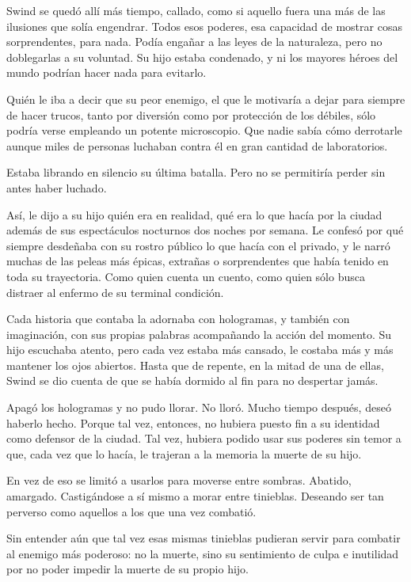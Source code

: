 Swind se quedó allí más tiempo, callado, como si aquello fuera una más de las ilusiones que solía engendrar. Todos esos poderes, esa capacidad de mostrar cosas sorprendentes, para nada. Podía engañar a las leyes de la naturaleza, pero no doblegarlas a su voluntad. Su hijo estaba condenado, y ni los mayores héroes del mundo podrían hacer nada para evitarlo.

Quién le iba a decir que su peor enemigo, el que le motivaría a dejar para siempre de hacer trucos, tanto por diversión como por protección de los débiles, sólo podría verse empleando un potente microscopio. Que nadie sabía cómo derrotarle aunque miles de personas luchaban contra él en gran cantidad de laboratorios.

Estaba librando en silencio su última batalla. Pero no se permitiría perder sin antes haber luchado.

Así, le dijo a su hijo quién era en realidad, qué era lo que hacía por la ciudad además de sus espectáculos nocturnos dos noches por semana. Le confesó por qué siempre desdeñaba con su rostro público lo que hacía con el privado, y le narró muchas de las peleas más épicas, extrañas o sorprendentes que había tenido en toda su trayectoria. Como quien cuenta un cuento, como quien sólo busca distraer al enfermo de su terminal condición.

Cada historia que contaba la adornaba con hologramas, y también con imaginación, con sus propias palabras acompañando la acción del momento. Su hijo escuchaba atento, pero cada vez estaba más cansado, le costaba más y más mantener los ojos abiertos. Hasta que de repente, en la mitad de una de ellas, Swind se dio cuenta de que se había dormido al fin para no despertar jamás.

Apagó los hologramas y no pudo llorar. No lloró. Mucho tiempo después, deseó haberlo hecho. Porque tal vez, entonces, no hubiera puesto fin a su identidad como defensor de la ciudad. Tal vez, hubiera podido usar sus poderes sin temor a que, cada vez que lo hacía, le trajeran a la memoria la muerte de su hijo.

En vez de eso se limitó a usarlos para moverse entre sombras. Abatido, amargado. Castigándose a sí mismo a morar entre tinieblas. Deseando ser tan perverso como aquellos a los que una vez combatió.

Sin entender aún que tal vez esas mismas tinieblas pudieran servir para combatir al enemigo más poderoso: no la muerte, sino su sentimiento de culpa e inutilidad por no poder impedir la muerte de su propio hijo.

